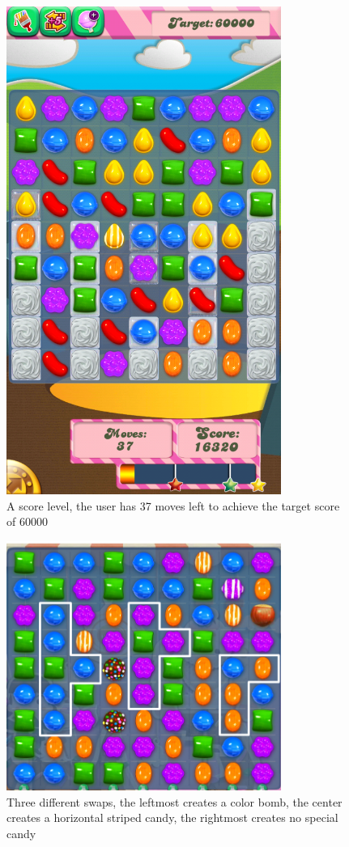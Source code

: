 \documentclass{kththesis}
\begin{document}
\begin{figure}
\centering
\includegraphics[width=0.8\textwidth]{images/candy_crush.png}
\caption{A score level, the user has 37 moves left to achieve the target score of 60000}
\label{fig:candy_crush}
\end{figure}


\begin{figure}
\centering
\includegraphics[width=0.8\textwidth]{images/special_candies_swap.png}
\caption{Three different swaps, the leftmost creates a color bomb, the center creates a horizontal striped candy, the rightmost creates no special candy}
\label{fig:special_candies_swap}
\end{figure}
\end{document}
